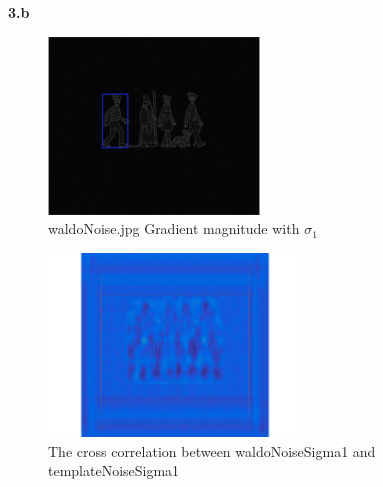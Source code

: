 \documentclass[11pt]{article}
\begin{document}
\noindent
\textbf{3.b} 
\begin{figure}[h]
  \caption{waldoNoise.jpg Gradient magnitude with $\sigma_1$}
  \centering
    \includegraphics[width=0.5\textwidth]{3b}
\end{figure}

\begin{figure}[h]
  \caption{The cross correlation between waldoNoiseSigma1 and templateNoiseSigma1}
  \centering
    \includegraphics[width=0.6\textwidth]{3bCorr}
\end{figure}
\end{document}

